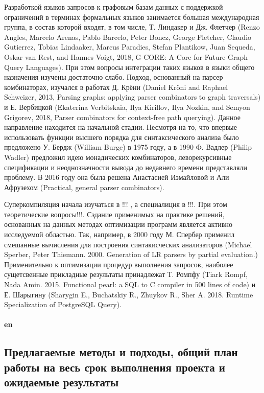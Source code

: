 \documentclass[12pt]{article}  %
\theoremstyle{remark}
\begin{document}
Разработкой языков запросов к графовым базам данных с поддержкой ограничений в терминах формальных языков занимается большая международная группа, в состав которой входят, в том числе, Т. Линдакер и Дж. Флетчер (Renzo Angles, Marcelo Arenas, Pablo Barcelo, Peter Boncz, George Fletcher, Claudio Gutierrez, Tobias Lindaaker, Marcus Paradies, Stefan Plantikow, Juan Sequeda, Oskar van Rest, and Hannes Voigt, 2018, G-CORE: A Core for Future Graph Query Languages). При этом вопросы интеграции таких языков в языки общего назначения изучены достаточно слабо. Подход, основанный на парсер комбинаторах, изучался в работах Д. Крёни (Daniel Kröni and Raphael Schweizer, 2013, Parsing graphs: applying parser combinators to graph traversals) и Е. Вербицкой (Ekaterina Verbitskaia, Ilya Kirillov, Ilya Nozkin, and Semyon Grigorev, 2018, Parser combinators for context-free path querying). Данное направление находится на начальной стадии.
Несмотря на то, что впервые использовать функции высшего порядка для синтаксического анализа было предложено У. Бердж (William Burge) в 1975 году, а в 1990 Ф. Вадлер (Philip Wadler) предложил идею монадических комбинаторов, леворекурсивные спецификации и неоднозначности вывода до недавнего времени представляли проблему.
В 2016 году она была решена Анастасией Измайловой и Али Афрузехом (Practical, general parser combinators).

Суперкомпиляция начала изучаться в !!! , а специалиция в !!!. При этом теоретические вопросы!!!. Сздание применимых на практике решений, основанных на данных методах оптимизации программ является активно исследуемой областью. Так, например, в 2000 году М. Спербер применил смешанные вычисления для построения синтакисческих анализаторов (Michael Sperber, Peter Thiemann. 2000. Generation of LR parsers by partial evaluation.) Применительно к оптимизации процедур выполнения запросов, наиболее сущетсвенные прикладные результаты принадлежат Т. Ромпфу (Tiark Rompf, Nada Amin. 2015. Functional pearl: a SQL to C compiler in 500 lines of code) и Е. Шарыгину (Sharygin E., Buchatskiy R., Zhuykov R., Sher A. 2018. Runtime Specialization of PostgreSQL Query).
\\
\\
\textbf{en}\\

\subsection{Предлагаемые методы и подходы, общий план работы на весь срок выполнения проекта и ожидаемые результаты }
\end{document}
